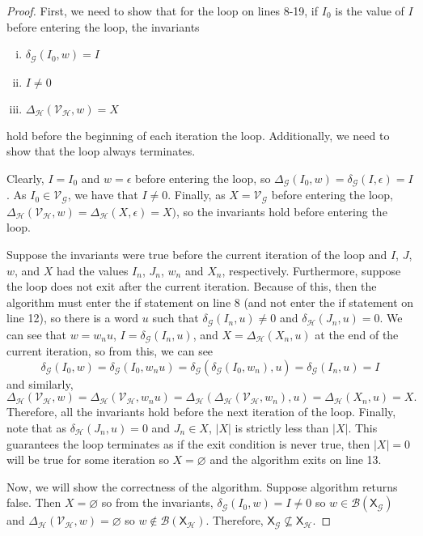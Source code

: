 \documentclass[hidelinks]{article}
\newcommand{\Gc}{\mathcal{G}}  %
\newcommand{\Hc}{\mathcal{H}}  %
\newcommand{\Vc}{\mathcal{V}}
\newcommand{\Bc}{\mathcal{B}}
\newcommand{\shift}[1]{\mathsf{X}_{#1}}
\theoremstyle{definition}
\begin{document}
\begin{proof}
    First, we need to show that for the loop on lines 8-19, if \(I_0\) is the 
    value of \(I\) before entering the loop, the invariants 
    \begin{enumerate}[(i)]
        \item \(\delta_\Gc(I_0, w) = I\)
        \item \(I \neq 0\)
        \item \(\Delta_\Hc(\Vc_\Hc, w) = X\)
    \end{enumerate}
    hold before the beginning of each iteration the loop. Additionally, we need to show that 
    the loop always terminates.

    Clearly, \(I = I_0\) and \(w = \epsilon\) before entering the loop, so \(\Delta_\Gc(I_0, w) = \delta_\Gc(I, \epsilon) = I\).
    As \(I_0 \in \Vc_\Gc\), we have that \(I \neq 0\). Finally, as \(X = \Vc_\Gc\) before 
    entering the loop, \(\Delta_\Hc(\Vc_\Hc, w) = \Delta_\Hc(X, \epsilon) = X)\), so the invariants hold 
    before entering the loop.

    Suppose the invariants were true before the current iteration of the loop and \(I\), \(J\), \(w\), and \(X\)
    had the values \(I_n\), \(J_n\), \(w_n\) and \(X_n\), respectively. Furthermore, suppose the loop does not exit
    after the current iteration. Because of this, then the algorithm must enter the 
    if statement on line 8 (and not enter the if statement on line 12), so there is a word \(u\) such that \(\delta_\Gc(I_n, u) \neq 0\)
    and \(\delta_\Hc(J_n, u) = 0\). We can see that \(w = w_n u\), \(I = \delta_\Gc(I_n, u)\), and 
    \(X = \Delta_\Hc(X_n, u)\) at the end of the current iteration, so from this, we can see 
    \[\delta_\Gc(I_0, w) = \delta_\Gc(I_0, w_n u) = \delta_\Gc(\delta_\Gc(I_0, w_n), u) = \delta_\Gc(I_n, u) = I\]
    and similarly,
    \[\Delta_\Hc(\Vc_\Hc, w) = \Delta_\Hc(\Vc_\Hc, w_n u) = \Delta_\Hc(\Delta_\Hc(\Vc_\Hc, w_n), u) = \Delta_\Hc(X_n, u) = X.\]
    Therefore, all the invariants hold before the next iteration of the loop.
    Finally, note that as \(\delta_\Hc(J_n, u) = 0\) and \(J_n \in X\), \(|X|\) is strictly less 
    than \(|X|\). This guarantees the loop terminates as if the exit condition is never 
    true, then \(|X| = 0\) will be true for some iteration so \(X = \varnothing\) and the algorithm exits on line 13. 

    Now, we will show the correctness of the algorithm. Suppose algorithm returns false. Then \(X = \varnothing\) so 
    from the invariants, \(\delta_\Gc(I_0, w) = I \neq 0\) so 
    \(w \in \Bc(\shift{\Gc})\) and \(\Delta_\Hc(\Vc_\Hc, w) = \varnothing\) so \(w \notin \Bc(\shift{\Hc})\).
    Therefore, \(\shift{\Gc} \nsubseteq \shift{\Hc}\). 


\end{proof}
\end{document}
